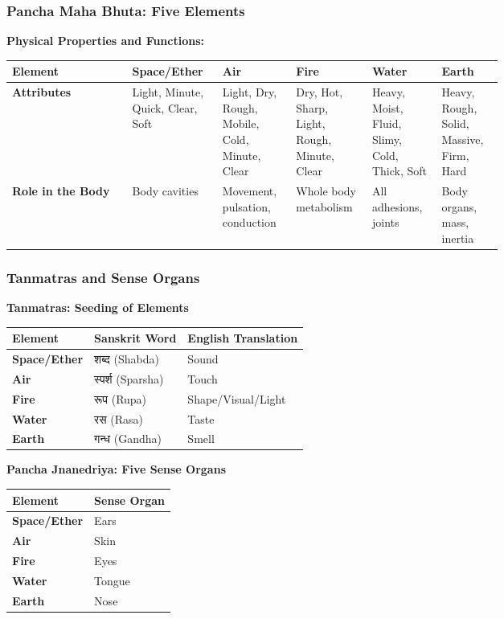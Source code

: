 \begin{frame}[fragile]\frametitle{Pancha Maha Bhuta: Five Elements}

    \textbf{Physical Properties and Functions:}
	
	
        \begin{tabular}{|p{0.21\linewidth}|p{0.1\linewidth}|p{0.1\linewidth}|p{0.1\linewidth}|p{0.1\linewidth}|p{0.1\linewidth}|}
    \hline
    \textbf{Element} & \textbf{Space/Ether} & \textbf{Air} & \textbf{Fire} & \textbf{Water} & \textbf{Earth} \\
    \hline
    \textbf{Attributes} & Light, Minute, Quick, Clear, Soft & Light, Dry, Rough, Mobile, Cold, Minute, Clear & Dry, Hot, Sharp, Light, Rough, Minute, Clear & Heavy, Moist, Fluid, Slimy, Cold, Thick, Soft & Heavy, Rough, Solid, Massive, Firm, Hard \\
    \hline
    \textbf{Role in the Body} & Body cavities & Movement, pulsation, conduction & Whole body metabolism & All adhesions, joints & Body organs, mass, inertia \\
    \hline
    \end{tabular}

\end{frame}


\begin{frame}[fragile]\frametitle{Tanmatras and Sense Organs}
    \textbf{Tanmatras: Seeding of Elements}
	
	
    \begin{tabular}{|l|l|l|}
    \hline
    \textbf{Element} & \textbf{Sanskrit Word} & \textbf{English Translation} \\
    \hline
    \textbf{Space/Ether} & शब्द (Shabda) & Sound \\
    \hline
    \textbf{Air} & स्पर्श (Sparsha) & Touch \\
    \hline
    \textbf{Fire} & रूप (Rupa) & Shape/Visual/Light \\
    \hline
    \textbf{Water} & रस (Rasa) & Taste \\
    \hline
    \textbf{Earth} & गन्ध (Gandha) & Smell \\
    \hline
    \end{tabular}


    \textbf{Pancha Jnanedriya: Five Sense Organs}
	
    \begin{tabular}{|l|l|}
    \hline
    \textbf{Element} & \textbf{Sense Organ} \\
    \hline
    \textbf{Space/Ether} & Ears \\
    \hline
    \textbf{Air} & Skin \\
    \hline
    \textbf{Fire} & Eyes \\
    \hline
    \textbf{Water} & Tongue \\
    \hline
    \textbf{Earth} & Nose \\
    \hline
    \end{tabular}
\end{frame}

